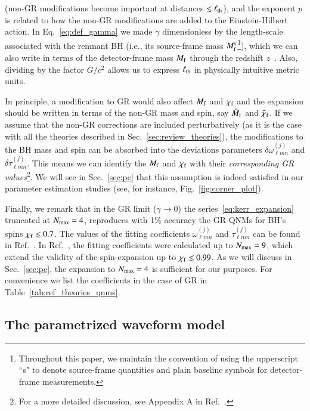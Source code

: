 \documentclass[twocolumn,
               prd,
               aps,
               superscriptaddress,
               tightenlines,
               nofootinbib,
               eqsecnum,
               amsfonts,
               amsmath,
               longbibliography]{revtex4-1}
\begin{document}
(non-GR modifications become important at distances $\lesssim \ell_{\rm th}$), and
the exponent $p$ is related to how the non-GR modifications are
added to the Einstein-Hilbert action.
%
In Eq.~\eqref{eq:def_gamma} we made $\gamma$ dimensionless by the
length-scale associated with the remnant BH (i.e., its source-frame mass
$M^{\rm s}_{\rm f}$\footnote{Throughout this paper, we maintain the convention of
using the upperscript ``s" to denote source-frame quantities and plain baseline
symbols for detector-frame measurements.}), which we can also write in terms of the detector-frame mass $M_{\rm f}$
through the redshift $z$~\cite{Krolak:1987ofj}. Also, dividing by the factor $G/c^2$ allows us to
express $\ell_{\rm th}$ in physically intuitive metric units.

In principle, a modification to GR would also affect $M_{\rm f}$ and $\chi_{\rm f}$ and the
expansion should be written in terms of the non-GR mass and spin, say $\bar{M}_{\rm f}$ and
$\bar{\chi}_{\rm f}$. If we assume that the non-GR corrections are included perturbatively
(as it is the case with all the theories described in Sec.~\ref{sec:review_theories}),
the modifications to the BH mass and spin can be absorbed into the deviations
parameters $\delta\omega^{(j)}_{\ell m n}$ and $\delta\tau^{(j)}_{\ell m n}$.
%
This means we can identify the $M_{\rm f}$ and $\chi_{\rm f}$ with their
\emph{corresponding {\rm GR} values}\footnote{For a more detailed discussion, see Appendix A in Ref.~\cite{Maselli:2019mjd}.}.
%
We will see in Sec.~\ref{sec:pe}  that this assumption is indeed
satisfied in our parameter estimation studies (see, for instance, Fig.~\ref{fig:corner_plot}).

Finally, we remark that in the GR limit ($\gamma \to 0$)
the series~\eqref{eq:kerr_expansion} truncated at $N_{\rm max} = 4$, reproduces with 1\% accuracy
the GR QNMs for BH's spins $\chi_{\rm f} \lesssim 0.7$.
%
The values of the fitting coefficients $\omega_{\ell m n}^{(j)}$ and $\tau_{\ell m n}^{(j)}$
can be found in Ref.~\cite{Maselli:2019mjd}.
%
In Ref.~\cite{Carullo:2021dui}, the fitting coefficients were calculated up to $N_{\rm max} = 9$,
which extend the validity of the spin-expansion up to $\chi_{\rm f} \lesssim 0.99$.
%
As we will discuss in Sec.~\ref{sec:pe}, the expansion to $N_{\rm max} = 4$ is
sufficient for our purposes. For convenience we list the coefficients in the case of
GR in Table~\ref{tab:ref_theories_qnms}.

\subsection{The parametrized waveform model}
\label{sec:review_pSEOB}
\end{document}
